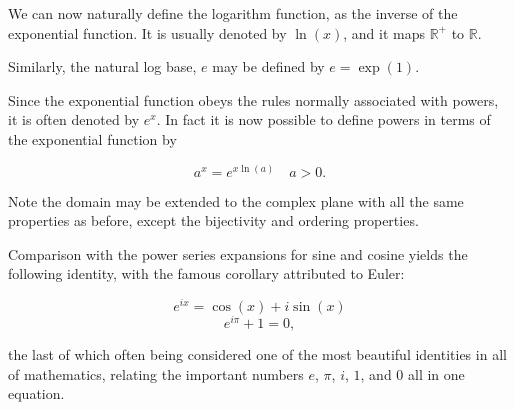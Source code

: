 \documentclass[12pt]{article}
\newcommand{\<}{\langle}
\renewcommand{\>}{\rangle}
\begin{document}
We can now naturally define the logarithm function, as the inverse of the exponential function. It is usually denoted by $\operatorname{ln}(x)$, and it maps $\mathbb{R}^+$ to $\mathbb{R}.$

Similarly, the natural log base, $e$ may be defined by $e = \exp(1).$

Since the exponential function obeys the rules normally associated with powers, it is often denoted by $e^x$. In fact it is now possible to define powers in terms of the exponential function by

$$a^x = e^{x\operatorname{ln}(a)} \quad a > 0.$$

Note the domain may be extended to the complex plane with all the same properties as before, except the bijectivity and ordering properties.

Comparison with the power series expansions for sine and cosine yields the following identity, with the famous corollary attributed to Euler:

$$e^{ix} = \cos(x) + i\sin(x)$$
$$e^{i\pi}+1=0,$$

the last of which often being considered one of the most beautiful identities in all of mathematics, relating the important numbers $e$, $\pi$, $i$, $1$, and $0$ all in one equation.
\end{document}
